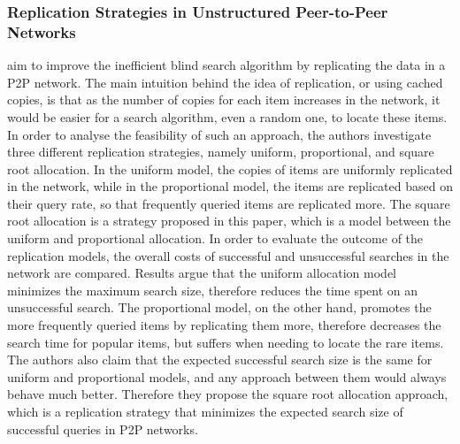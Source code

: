 \subsubsection{Replication Strategies in Unstructured Peer-to-Peer Networks}
\cite{CS2002} aim to improve the inefficient blind search algorithm by
replicating the data in a P2P network. The main intuition behind the
idea of replication, or using cached copies, is that as the number of copies for
each item increases in the network, it would be easier for a search algorithm,
even a random one, to locate these items. In order to analyse the feasibility of
such an approach, the authors investigate three different replication
strategies, namely uniform, proportional, and square root allocation. In the
uniform model, the copies of items are uniformly replicated in the network,
while in the proportional model, the items are replicated based on their query
rate, so that frequently queried items are replicated more. The square root
allocation is a strategy proposed in this paper, which is a model between the
uniform and proportional allocation.  In order to evaluate the outcome of the
replication models, the overall costs of successful and unsuccessful searches in
the network are compared. Results argue that the uniform allocation model
minimizes the maximum search size, therefore reduces the time spent on an
unsuccessful search. The proportional model, on the other hand, promotes the
more frequently queried items by replicating them more, therefore decreases the
search time for popular items, but suffers when needing to locate the rare
items. The authors also claim that the expected successful search size is the
same for uniform and proportional models, and any approach between them would
always behave much better. Therefore they propose the square root allocation
approach, which is a replication strategy that minimizes the expected search
size of successful queries in P2P networks.

